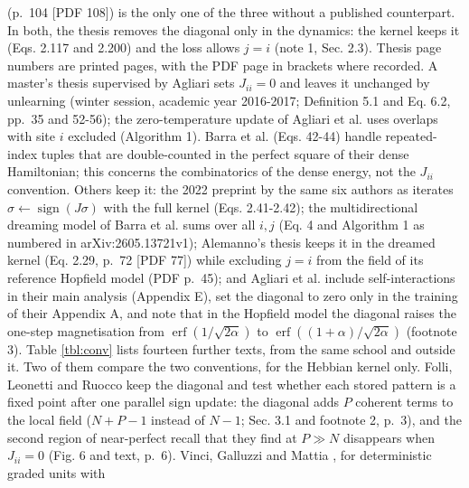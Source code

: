 \begin{enumerate}
  (p.~104 {[}PDF 108{]}) is the only one of the three without a
  published counterpart. In both, the thesis removes the diagonal only
  in the dynamics: the kernel keeps it (Eqs. 2.117 and 2.200) and the
  loss allows \(j = i\) (note 1, Sec. 2.3). Thesis page numbers are
  printed pages, with the PDF page in brackets where recorded. A
  master's thesis supervised by Agliari sets \(J_{ii} = 0\) and leaves
  it unchanged by unlearning \supercite{canali2017thesis} (winter
  session, academic year 2016-2017; Definition 5.1 and Eq. 6.2, pp.~35
  and 52-56); the zero-temperature update of Agliari et al.
  \supercite{agliari2026exponential} uses overlaps with site \(i\)
  excluded (Algorithm 1). Barra et al. \supercite{barra2025supralinear}
  (Eqs. 42-44) handle repeated-index tuples that are double-counted in
  the perfect square of their dense Hamiltonian; this concerns the
  combinatorics of the dense energy, not the \(J_{ii}\) convention.
  Others keep it: the 2022 preprint by the same six authors as
  \supercite{agliari2024hebbian} iterates
  \(\sigma \leftarrow \operatorname{sign}(J\sigma)\) with the full
  kernel \supercite{aquaro2022recurrent} (Eqs. 2.41-2.42); the
  multidirectional dreaming model of Barra et al.
  \supercite{barra2027dlam} sums over all \(i, j\) (Eq. 4 and Algorithm 1
  as numbered in arXiv:2605.13721v1); Alemanno's thesis
  \supercite{alemanno2021thesis} keeps it in the dreamed kernel (Eq.
  2.29, p.~72 {[}PDF 77{]}) while excluding \(j = i\) from the field of
  its reference Hopfield model (PDF p.~45); and Agliari et al.
  \supercite{agliari2025empty} include self-interactions in their main
  analysis (Appendix E), set the diagonal to zero only in the training
  of their Appendix A, and note that in the Hopfield model the diagonal
  raises the one-step magnetisation from
  \(\operatorname{erf}(1/\sqrt{2\alpha})\) to
  \(\operatorname{erf}((1+\alpha)/\sqrt{2\alpha})\) (footnote 3). Table
  \ref{tbl:conv} lists fourteen further texts, from the same school and
  outside it. Two of them compare the two conventions, for the Hebbian
  kernel only. Folli, Leonetti and Ruocco \supercite{folli2017maximum}
  keep the diagonal and test whether each stored pattern is a fixed
  point after one parallel sign update: the diagonal adds \(P\) coherent
  terms to the local field (\(N + P - 1\) instead of \(N - 1\); Sec. 3.1
  and footnote 2, p.~3), and the second region of near-perfect recall
  that they find at \(P \gg N\) disappears when \(J_{ii} = 0\) (Fig. 6
  and text, p.~6). Vinci, Galluzzi and Mattia
  \supercite{vinci2025beyond}, for deterministic graded units with

\end{enumerate}

